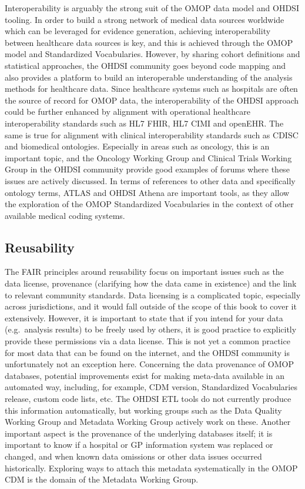 \documentclass[11pt]{book}
\theoremstyle{definition}
\theoremstyle{definition}
\theoremstyle{definition}
\theoremstyle{remark}
\begin{document}
Interoperability is arguably the strong suit of the OMOP data model and OHDSI tooling. In order to build a strong network of medical data sources worldwide which can be leveraged for evidence generation, achieving interoperability between healthcare data sources is key, and this is achieved through the OMOP model and Standardized Vocabularies. However, by sharing cohort definitions and statistical approaches, the OHDSI community goes beyond code mapping and also provides a platform to build an interoperable understanding of the analysis methods for healthcare data.
Since healthcare systems such as hospitals are often the source of record for OMOP data, the interoperability of the OHDSI approach could be further enhanced by alignment with operational healthcare interoperability standards such as HL7 FHIR, HL7 CIMI and openEHR. The same is true for alignment with clinical interoperability standards such as CDISC and biomedical ontologies. Especially in areas such as oncology, this is an important topic, and the Oncology Working Group and Clinical Trials Working Group in the OHDSI community provide good examples of forums where these issues are actively discussed.
In terms of references to other data and specifically ontology terms, ATLAS and OHDSI Athena are important tools, as they allow the exploration of the OMOP Standardized Vocabularies in the context of other available medical coding systems.

\hypertarget{reusability}{%
\subsection{Reusability}\label{reusability}}

The FAIR principles around reusability focus on important issues such as the data license, provenance (clarifying how the data came in existence) and the link to relevant community standards.
Data licensing is a complicated topic, especially across jurisdictions, and it would fall outside of the scope of this book to cover it extensively. However, it is important to state that if you intend for your data (e.g.~analysis results) to be freely used by others, it is good practice to explicitly provide these permissions via a data license. This is not yet a common practice for most data that can be found on the internet, and the OHDSI community is unfortunately not an exception here.
Concerning the data provenance of OMOP databases, potential improvements exist for making meta-data available in an automated way, including, for example, CDM version, Standardized Vocabularies release, custom code lists, etc. The OHDSI ETL tools do not currently produce this information automatically, but working groups such as the Data Quality Working Group and Metadata Working Group actively work on these. Another important aspect is the provenance of the underlying databases itself; it is important to know if a hospital or GP information system was replaced or changed, and when known data omissions or other data issues occurred historically. Exploring ways to attach this metadata systematically in the OMOP CDM is the domain of the Metadata Working Group.
\end{document}
